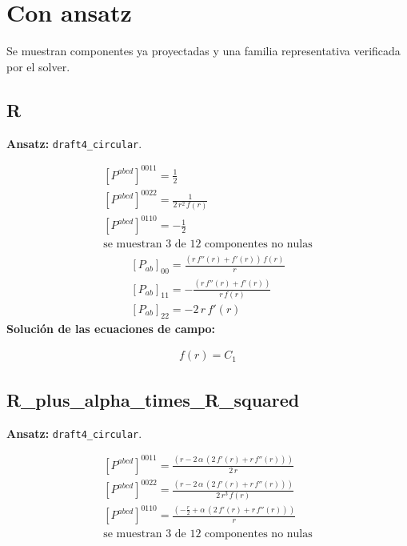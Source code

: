 \documentclass[10pt]{article}
\begin{document}
\section*{Con ansatz}
Se muestran componentes ya proyectadas y una familia representativa verificada por el solver.
\subsection*{R}
\textbf{Ansatz:} \texttt{draft4\_circular}.\par
\[\begin{aligned}\left[P^{abcd}\right]^{0011}=\frac{1}{2}\\[2pt]\left[P^{abcd}\right]^{0022}=\frac{1}{2\,{r}^{2}\,f\!\left(r\right)}\\[2pt]\left[P^{abcd}\right]^{0110}=-\frac{1}{2}\\[2pt]\text{se muestran 3 de 12 componentes no nulas}\end{aligned}\]
\[\begin{aligned}\left[P_{ab}\right]_{00}=\frac{\left(r\,f''\!\left(r\right) + f'\!\left(r\right)\right)\,f\!\left(r\right)}{r}\\[2pt]\left[P_{ab}\right]_{11}=-\frac{\left(r\,f''\!\left(r\right) + f'\!\left(r\right)\right)}{r\,f\!\left(r\right)}\\[2pt]\left[P_{ab}\right]_{22}=-2\,r\,f'\!\left(r\right)\end{aligned}\]
\noindent\textbf{Solución de las ecuaciones de campo:}\par
\[\begin{aligned}f\!\left(r\right)=C_{1}\end{aligned}\]
\subsection*{R\_plus\_alpha\_times\_R\_squared}
\textbf{Ansatz:} \texttt{draft4\_circular}.\par
\[\begin{aligned}\left[P^{abcd}\right]^{0011}=\frac{\left(r - 2\,\alpha\,\left(2\,f'\!\left(r\right) + r\,f''\!\left(r\right)\right)\right)}{2\,r}\\[2pt]\left[P^{abcd}\right]^{0022}=\frac{\left(r - 2\,\alpha\,\left(2\,f'\!\left(r\right) + r\,f''\!\left(r\right)\right)\right)}{2\,{r}^{3}\,f\!\left(r\right)}\\[2pt]\left[P^{abcd}\right]^{0110}=\frac{\left(-\frac{r}{2} + \alpha\,\left(2\,f'\!\left(r\right) + r\,f''\!\left(r\right)\right)\right)}{r}\\[2pt]\text{se muestran 3 de 12 componentes no nulas}\end{aligned}\]
\end{document}
